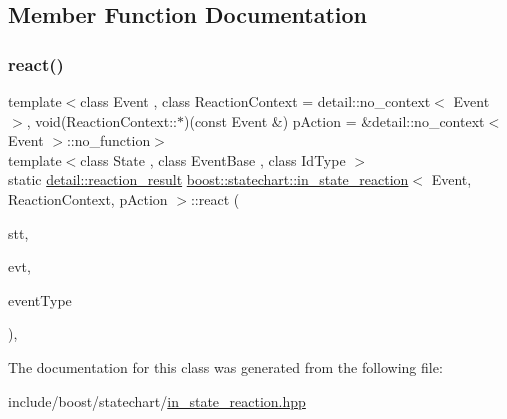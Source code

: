 \subsection{Member Function Documentation}
\mbox{\label{classboost_1_1statechart_1_1in__state__reaction_a148feecc17c524e2552e82362be63a19}} 
\subsubsection{\texorpdfstring{react()}{react()}}
{\footnotesize\ttfamily template$<$class Event , class Reaction\+Context  = detail\+::no\+\_\+context$<$ Event $>$, void(\+Reaction\+Context\+::$\ast$)(const Event \&) p\+Action = \&detail\+::no\+\_\+context$<$ Event $>$\+::no\+\_\+function$>$ \\
template$<$class State , class Event\+Base , class Id\+Type $>$ \\
static \mbox{\hyperlink{namespaceboost_1_1statechart_1_1detail_ab091bbb4c29327fb46ee479ea1b7255b}{detail\+::reaction\+\_\+result}} \mbox{\hyperlink{classboost_1_1statechart_1_1in__state__reaction}{boost\+::statechart\+::in\+\_\+state\+\_\+reaction}}$<$ Event, Reaction\+Context, p\+Action $>$\+::react (\begin{DoxyParamCaption}\item[{State \&}]{stt,  }\item[{const Event\+Base \&}]{evt,  }\item[{const Id\+Type \&}]{event\+Type }\end{DoxyParamCaption})\hspace{0.3cm}{\ttfamily [inline]}, {\ttfamily [static]}}



The documentation for this class was generated from the following file\+:\begin{DoxyCompactItemize}
\item 
include/boost/statechart/\mbox{\hyperlink{in__state__reaction_8hpp}{in\+\_\+state\+\_\+reaction.\+hpp}}\end{DoxyCompactItemize}
